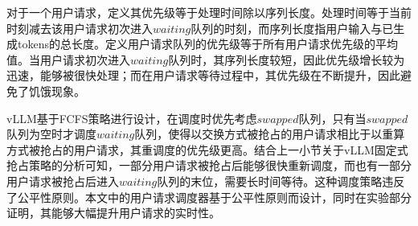对于一个用户请求，定义其优先级等于处理时间除以序列长度。处理时间等于当前时刻减去该用户请求初次进入$waiting$队列的时刻，而序列长度指用户输入与已生成tokens的总长度。定义用户请求队列的优先级等于所有用户请求优先级的平均值。当用户请求初次进入$waiting$队列时，其序列长度较短，因此优先级增长较为迅速，能够被很快处理；而在用户请求等待过程中，其优先级在不断提升，因此避免了饥饿现象。 \par

vLLM基于FCFS策略进行设计，在调度时优先考虑$swapped$队列，只有当$swapped$队列为空时才调度$waiting$队列，使得以交换方式被抢占的用户请求相比于以重算方式被抢占的用户请求，其重调度的优先级更高。结合上一小节关于vLLM固定式抢占策略的分析可知，一部分用户请求被抢占后能够很快重新调度，而也有一部分用户请求被抢占后进入$waiting$队列的末位，需要长时间等待。这种调度策略违反了公平性原则。本文中的用户请求调度器基于公平性原则而设计，同时在实验部分证明，其能够大幅提升用户请求的实时性。